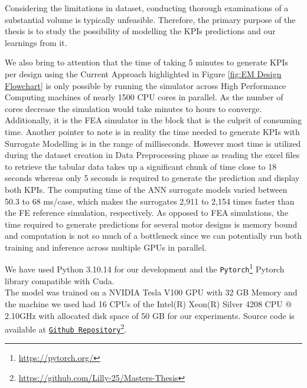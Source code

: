 \documentclass{report} %
\begin{document}
\vspace{1em} %

Considering the limitations in dataset, conducting thorough examinations of a substantial volume is typically unfeasible. 
Therefore, the primary purpose of the thesis is to study the possibility of modelling the \ac{KPI}s predictions and our learnings from it.

We also bring to attention that the time of taking 5 minutes to generate \ac{KPI}s per design using the Current Approach highlighted in Figure 
\ref{fig:EM Design Flowchart} is only possible by running the simulator across High Performance Computing machines of nearly 1500 CPU cores in parallel. 
As the number of cores decrease the simulation would take minutes to hours to converge. Additionally, it is the \ac{FEA} simulator in the block that is the culprit of 
consuming time. Another pointer to note is in reality the time needed to generate \ac{KPI}s with Surrogate Modelling is in the range of milliseconds. 
However most time is utilized during the dataset creation in Data Preprocessing phase as reading the excel files to retrieve the tabular data takes up a 
significant chunk of time close to 18 seconds whereas only 5 seconds is required to generate the prediction and display both \ac{KPI}s.
The computing time of the \ac{ANN} surrogate models varied between 50.3 to 68 ms/case, which makes the surrogates 2,911 to 2,154 times faster than the FE reference simulation, 
respectively. As opposed to \ac{FEA} simulations, the time required to generate predictions for several motor designs is memory bound 
and computation is not so much of a bottleneck since we can potentially run both training and inference across multiple GPUs in parallel.

We have used Python 3.10.14 for our development and the \texttt{Pytorch}\footnote{\url{https://pytorch.org/}} Pytorch library compatible with Cuda.\\
The model was trained on a NVIDIA Tesla V100 \ac{GPU} with 32 GB Memory and the machine we used had 16 CPUs of the Intel(R) Xeon(R) Silver 4208 CPU @ 2.10GHz 
with allocated disk space of 50 GB for our experiments.
Source code is available at \texttt{\href{https://github.com/Lilly-25/Masters-Thesis}{Github Repository}}\footnote{\url{https://github.com/Lilly-25/Masters-Thesis}}.

\end{document}
